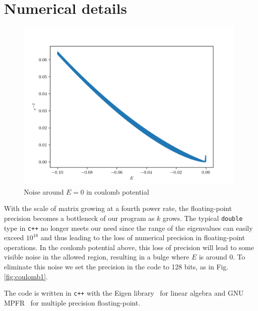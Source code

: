 \documentclass[aps, preprint,amsmath, amssymb]{revtex4-2}
\begin{document}
\appendix* 
	\section{Numerical details}
	\begin{figure}
		\includegraphics[width=0.8\linewidth]{noise.png}
		\caption{Noise around $E=0$ in coulomb potential}
	\end{figure}
	With the scale of matrix growing at a fourth power rate, the floating-point precision becomes a bottleneck of our program as $k$ grows. The typical \texttt{double} type in \texttt{c++} no longer meets our need since the range of the eigenvalues can easily exceed $10^{18}$ and thus leading to the loss of numerical precision in floating-point operations. In the coulomb potential above, this loss of precision will lead to some visible noise in the allowed region, resulting in a bulge where $E$ is around $0$. To eliminate this noise we set the precision in the code to 128 bits, as in Fig.\ref{fig:coulomb1}.

	The code is written in \texttt{c++} with the Eigen library~\cite{eigenweb} for linear algebra and GNU MPFR~\cite{fousse2007mpfr} for multiple precision floating-point.
	


\end{document}
